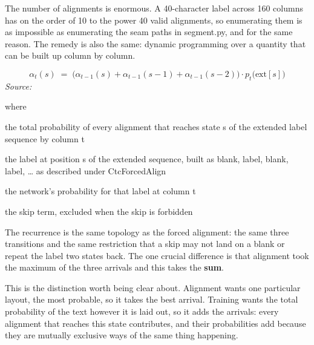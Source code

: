 The number of alignments is enormous. A 40-character label across 160 columns has on the order of 10 to the power 40 valid alignments, so enumerating them is as impossible as enumerating the seam paths in segment.py, and for the same reason. The remedy is also the same: dynamic programming over a quantity that can be built up column by column.



\begin{equation}
\alpha_t(s) \;=\; \Big(\alpha_{t-1}(s) + \alpha_{t-1}(s-1) + \alpha_{t-1}(s-2)\Big) \cdot p_t\big(\mathrm{ext}[s]\big)
\end{equation}
\noindent\emph{Source: }\cite{graves2006}


\noindent where
\begin{description}[leftmargin=2.4em,style=nextline,font=\normalfont\ttfamily]\setlength\itemsep{1pt}
  \item[{$\alpha_t(s)$}] \normalfont the total probability of every alignment that reaches state s of the extended label sequence by column t
  \item[{$\mathrm{ext}[s]$}] \normalfont the label at position s of the extended sequence, built as blank, label, blank, label, … as described under CtcForcedAlign
  \item[{$p_t(\cdot)$}] \normalfont the network's probability for that label at column t
  \item[{$\alpha_{t-1}(s-2)$}] \normalfont the skip term, excluded when the skip is forbidden
\end{description}
The recurrence is the same topology as the forced alignment: the same three transitions and the same restriction that a skip may not land on a blank or repeat the label two states back. The one crucial difference is that alignment took the maximum of the three arrivals and this takes the \textbf{sum}.


This is the distinction worth being clear about. Alignment wants one particular layout, the most probable, so it takes the best arrival. Training wants the total probability of the text however it is laid out, so it adds the arrivals: every alignment that reaches this state contributes, and their probabilities add because they are mutually exclusive ways of the same thing happening.

